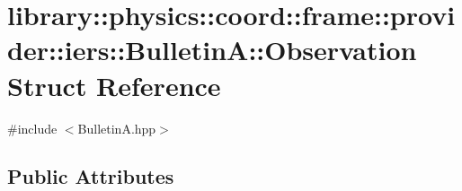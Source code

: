 \hypertarget{structlibrary_1_1physics_1_1coord_1_1frame_1_1provider_1_1iers_1_1_bulletin_a_1_1_observation}{}\section{library\+:\+:physics\+:\+:coord\+:\+:frame\+:\+:provider\+:\+:iers\+:\+:BulletinA\+:\+:Observation Struct Reference}
\label{structlibrary_1_1physics_1_1coord_1_1frame_1_1provider_1_1iers_1_1_bulletin_a_1_1_observation}


{\ttfamily \#include $<$Bulletin\+A.\+hpp$>$}

\subsection*{Public Attributes}
